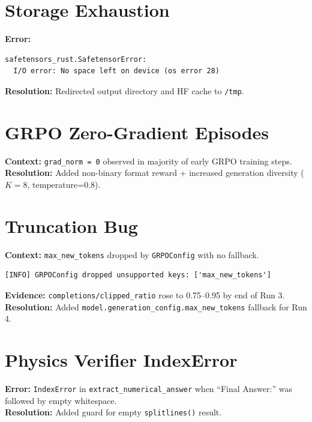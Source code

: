 \documentclass[12pt]{report}
\begin{document}
\section{Storage Exhaustion}
\textbf{Error:}
\begin{verbatim}
safetensors_rust.SafetensorError: 
  I/O error: No space left on device (os error 28)
\end{verbatim}
\textbf{Resolution:} Redirected output directory and HF cache to \texttt{/tmp}.

\section{GRPO Zero-Gradient Episodes}
\textbf{Context:} \texttt{grad\_norm = 0} observed in majority of early GRPO training steps.\\
\textbf{Resolution:} Added non-binary format reward + increased generation diversity ($K=8$, temperature=0.8).

\section{Truncation Bug}
\textbf{Context:} \texttt{max\_new\_tokens} dropped by \texttt{GRPOConfig} with no fallback.
\begin{verbatim}
[INFO] GRPOConfig dropped unsupported keys: ['max_new_tokens']
\end{verbatim}
\textbf{Evidence:} \texttt{completions/\allowbreak clipped\_ratio} rose to 0.75--0.95 by end of Run 3.\\
\textbf{Resolution:} Added \texttt{model.generation\_config.max\_new\_tokens} fallback for Run 4.

\section{Physics Verifier IndexError}
\textbf{Error:} \texttt{IndexError} in \texttt{extract\_numerical\_answer} when ``Final Answer:'' was followed by empty whitespace.\\
\textbf{Resolution:} Added guard for empty \texttt{splitlines()} result.
\end{document}
